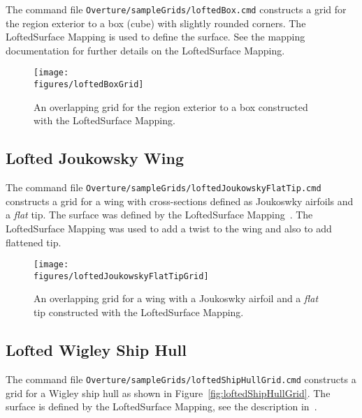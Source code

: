 \documentclass[xcolor=rgb,svgnames,dvipsnames]{article}
\newcommand{\figures}{\homeHenshaw/OvertureFigures}
\begin{document}
The command file {\tt Overture/sampleGrids/loftedBox.cmd} constructs a grid for
the region exterior to a box (cube) with slightly rounded corners. 
The LoftedSurface Mapping is used to define the surface. See the mapping documentation
for further details on the LoftedSurface Mapping.

\begin{figure}[htb]
  \begin{center}
   \texttt{[image: \\figures/loftedBoxGrid]}
  \caption{An overlapping grid for the region exterior to a box constructed with the LoftedSurface Mapping. } \label{fig:loftedBoxGrid}
  \end{center}
\end{figure}



\subsection{Lofted Joukowsky Wing}\label{sec:LoftedJoukowskyWing}

The command file {\tt Overture/sampleGrids/loftedJoukowskyFlatTip.cmd} constructs a grid for
a wing with cross-sections defined as Joukoswky airfoils and a {\em flat} tip. The surface
was defined by the LoftedSurface Mapping~\cite{MAPPINGS}. The LoftedSurface Mapping was used to add a
twist to the wing and also to add flattened tip.

\begin{figure}[htb]
  \begin{center}
   \texttt{[image: \\figures/loftedJoukowskyFlatTipGrid]}
  \caption{An overlapping grid for a wing with a Joukoswky airfoil and a {\em flat} tip
            constructed with the LoftedSurface Mapping. } \label{fig:loftedJoukowskyWing}
  \end{center}
\end{figure}

\subsection{Lofted Wigley Ship Hull}\label{sec:LoftedWigleyShipHull}

The command file {\tt Overture/sampleGrids/loftedShipHullGrid.cmd} constructs a grid for
a Wigley ship hull as shown in Figure~\ref{fig:loftedShipHullGrid}. The surface
is defined by the LoftedSurface Mapping, see the description in~\cite{MAPPINGS}. 
\end{document}
